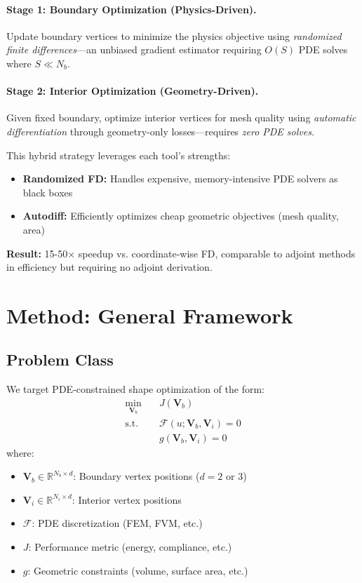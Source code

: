 \documentclass{article}
\begin{document}
\paragraph{Stage 1: Boundary Optimization (Physics-Driven).}
Update boundary vertices to minimize the physics objective using \emph{randomized finite differences}—an unbiased gradient estimator requiring $O(S)$ PDE solves where $S \ll N_b$.

\paragraph{Stage 2: Interior Optimization (Geometry-Driven).}
Given fixed boundary, optimize interior vertices for mesh quality using \emph{automatic differentiation} through geometry-only losses—requires \emph{zero PDE solves}.

This hybrid strategy leverages each tool's strengths:
\begin{itemize}
    \item \textbf{Randomized FD:} Handles expensive, memory-intensive PDE solvers as black boxes
    \item \textbf{Autodiff:} Efficiently optimizes cheap geometric objectives (mesh quality, area)
\end{itemize}

\textbf{Result:} 15-50$\times$ speedup vs. coordinate-wise FD, comparable to adjoint methods in efficiency but requiring no adjoint derivation.

\section{Method: General Framework}

\subsection{Problem Class}

We target PDE-constrained shape optimization of the form:
\begin{align}
    \min_{\mathbf{V}_b} \quad & J(\mathbf{V}_b) \label{eq:discrete_objective} \\
    \text{s.t.} \quad & \mathcal{F}(u; \mathbf{V}_b, \mathbf{V}_i) = 0 \label{eq:discrete_pde} \\
    & g(\mathbf{V}_b, \mathbf{V}_i) = 0 \label{eq:discrete_constraint}
\end{align}
where:
\begin{itemize}
    \item $\mathbf{V}_b \in \mathbb{R}^{N_b \times d}$: Boundary vertex positions ($d = 2$ or $3$)
    \item $\mathbf{V}_i \in \mathbb{R}^{N_i \times d}$: Interior vertex positions
    \item $\mathcal{F}$: PDE discretization (FEM, FVM, etc.)
    \item $J$: Performance metric (energy, compliance, etc.)
    \item $g$: Geometric constraints (volume, surface area, etc.)
\end{itemize}
\end{document}
